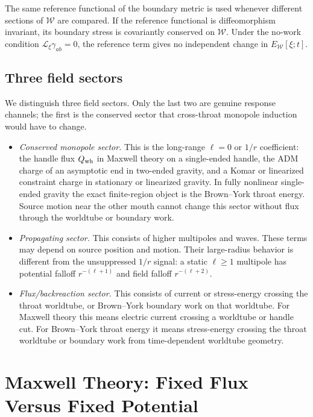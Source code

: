 \documentclass[aps,prd,10pt,onecolumn,nofootinbib,superscriptaddress,floatfix]{revtex4-2}
\begin{document}
The same reference functional of the boundary metric is used whenever
different sections of $\mathcal W$ are compared.  If the reference functional
is diffeomorphism invariant, its boundary stress is covariantly conserved on
$\mathcal W$.  Under the no-work condition $\mathcal L_\xi\gamma_{ab}=0$, the
reference term gives no independent change in $E_{\mathcal W}[\xi;t]$.

\subsection{Three field sectors}

We distinguish three field sectors.  Only the last two are genuine response
channels; the first is the conserved sector that cross-throat monopole
induction would have to change.
\begin{itemize}
\item \emph{Conserved monopole sector.}  This is the long-range $\ell=0$ or
$1/r$ coefficient: the handle flux $Q_{\rm wh}$ in Maxwell theory on a
single-ended handle, the ADM charge of an asymptotic end in two-ended gravity,
and a Komar or linearized constraint charge in stationary or linearized
gravity.  In fully nonlinear single-ended gravity the exact finite-region
object is the Brown--York throat energy.  Source motion near the other mouth
cannot change this sector without flux through the worldtube or boundary work.
\item \emph{Propagating sector.}  This consists of higher multipoles and waves.
These terms may depend on source position and motion.  Their large-radius behavior is
different from the unsuppressed $1/r$ signal: a static $\ell\ge1$ multipole has
potential falloff $r^{-(\ell+1)}$ and field falloff $r^{-(\ell+2)}$.
\item \emph{Flux/backreaction sector.}  This consists of current or
stress-energy crossing the throat worldtube, or Brown--York boundary work on
that worldtube.  For Maxwell theory this means electric current crossing a
worldtube or handle cut.  For Brown--York throat energy it means stress-energy
crossing the throat worldtube or boundary work from time-dependent worldtube
geometry.
\end{itemize}

\section{Maxwell Theory: Fixed Flux Versus Fixed Potential}
\label{sec:maxwell}
\end{document}
